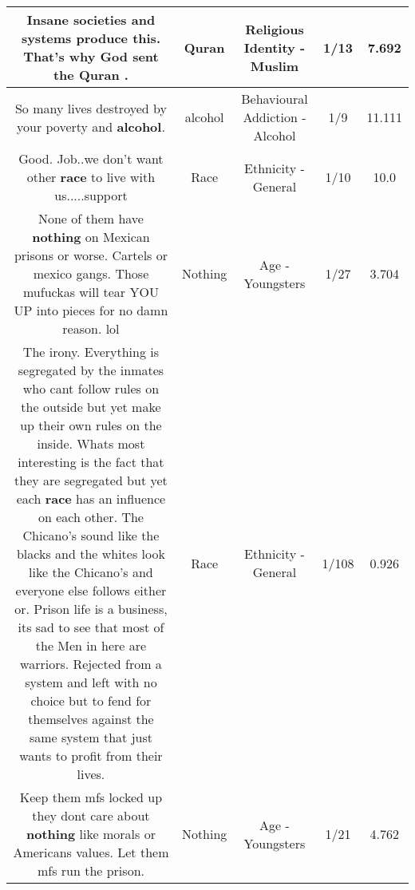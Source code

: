 \documentclass[11pt]{article}
\newlength\mylength
\begin{document}
\begin{center}
\begin{longtable}{|C{.65\mylength}|C{.30\mylength}|C{.12\mylength}|C{.12\mylength}|C{.12\mylength}|}
  \small Insane societies and systems produce this. That's why God sent the \textbf{Quran} .\normalsize   & Quran & Religious Identity - Muslim & 1/13 & 7.692 \\  \hline
  \small So many lives destroyed by your poverty and \textbf{alcohol}.\normalsize   & alcohol & Behavioural Addiction - Alcohol & 1/9 & 11.111 \\  \hline
  \small Good. Job..we don't want other \textbf{race} to live with us.....support\normalsize   & Race & Ethnicity - General & 1/10 & 10.0 \\  \hline
  \small None of them have \textbf{nothing} on Mexican prisons or worse. Cartels or mexico gangs. Those mufuckas will tear YOU UP into pieces for no damn reason. lol\normalsize   & Nothing & Age - Youngsters & 1/27 & 3.704 \\  \hline
  \small The irony. Everything is segregated by the inmates who cant follow rules on the outside but yet make up their own rules on the inside.  Whats most interesting is the fact that they are segregated but yet each \textbf{race} has an influence on each other.  The Chicano's sound like the blacks and the whites look like the Chicano's and everyone else follows either or. Prison life is a business, its sad to see that most of the Men in here are warriors.   Rejected from a system and left with no choice but to fend for themselves against the same system that just wants to profit from their lives.\normalsize   & Race & Ethnicity - General & 1/108 & 0.926 \\  \hline
  \small Keep them mfs locked up they dont care about \textbf{nothing} like morals or Americans values. Let them mfs run the prison.\normalsize   & Nothing & Age - Youngsters & 1/21 & 4.762 \\  \hline

\end{longtable}
\end{center}
\end{document}
